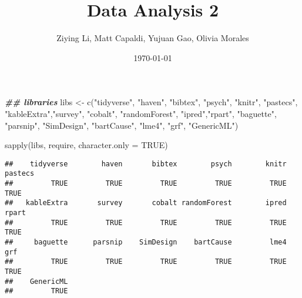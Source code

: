 \documentclass[
]{article}
\title{Data Analysis 2}
\author{Ziying Li, Matt Capaldi, Yujuan Gao, Olivia Morales}
\date{\today}
\newenvironment{Shaded}{\begin{snugshade}}{\end{snugshade}}
\newcommand{\AttributeTok}[1]{\textcolor[rgb]{0.77,0.63,0.00}{#1}}
\newcommand{\ConstantTok}[1]{\textcolor[rgb]{0.00,0.00,0.00}{#1}}
\newcommand{\DocumentationTok}[1]{\textcolor[rgb]{0.56,0.35,0.01}{\textbf{\textit{#1}}}}
\newcommand{\FunctionTok}[1]{\textcolor[rgb]{0.00,0.00,0.00}{#1}}
\newcommand{\NormalTok}[1]{#1}
\newcommand{\OtherTok}[1]{\textcolor[rgb]{0.56,0.35,0.01}{#1}}
\newcommand{\StringTok}[1]{\textcolor[rgb]{0.31,0.60,0.02}{#1}}
\begin{document}
\maketitle

\usepackage{fontspec}

\begin{Shaded}
\begin{Highlighting}[]
\DocumentationTok{\#\# libraries}
\NormalTok{libs }\OtherTok{\textless{}{-}} \FunctionTok{c}\NormalTok{(}\StringTok{"tidyverse"}\NormalTok{, }\StringTok{"haven"}\NormalTok{, }\StringTok{"bibtex"}\NormalTok{, }\StringTok{"psych"}\NormalTok{, }\StringTok{"knitr"}\NormalTok{, }\StringTok{"pastecs"}\NormalTok{, }\StringTok{"kableExtra"}\NormalTok{,}\StringTok{"survey"}\NormalTok{, }\StringTok{"cobalt"}\NormalTok{, }\StringTok{"randomForest"}\NormalTok{, }\StringTok{"ipred"}\NormalTok{,}\StringTok{"rpart"}\NormalTok{, }\StringTok{"baguette"}\NormalTok{, }\StringTok{"parsnip"}\NormalTok{, }\StringTok{"SimDesign"}\NormalTok{, }\StringTok{"bartCause"}\NormalTok{, }\StringTok{"lme4"}\NormalTok{, }\StringTok{"grf"}\NormalTok{, }\StringTok{"GenericML"}\NormalTok{)}

\FunctionTok{sapply}\NormalTok{(libs, require, }\AttributeTok{character.only =} \ConstantTok{TRUE}\NormalTok{)}
\end{Highlighting}
\end{Shaded}

\begin{verbatim}
##    tidyverse        haven       bibtex        psych        knitr      pastecs 
##         TRUE         TRUE         TRUE         TRUE         TRUE         TRUE 
##   kableExtra       survey       cobalt randomForest        ipred        rpart 
##         TRUE         TRUE         TRUE         TRUE         TRUE         TRUE 
##     baguette      parsnip    SimDesign    bartCause         lme4          grf 
##         TRUE         TRUE         TRUE         TRUE         TRUE         TRUE 
##    GenericML 
##         TRUE
\end{verbatim}
\end{document}
